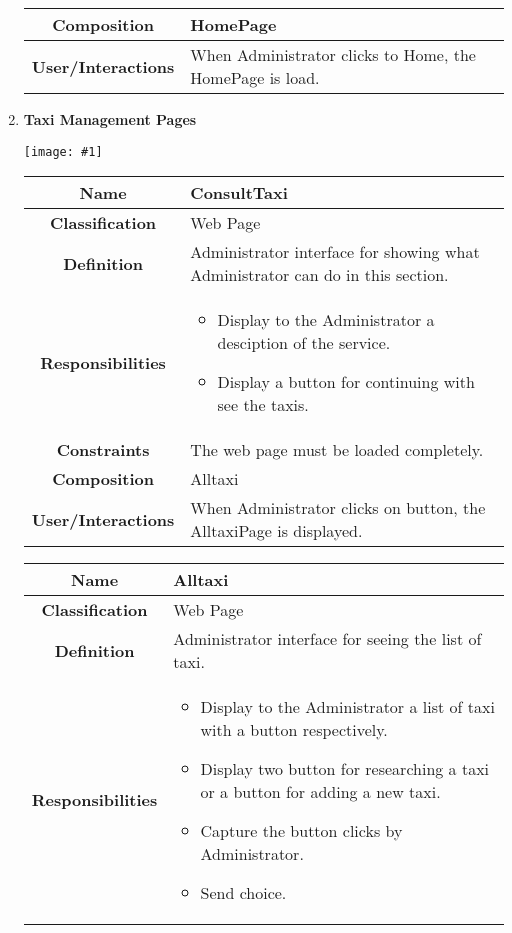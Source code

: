 \documentclass[11pt, a4paper,titlepage]{article}
\newcommand{\image}[1]{
	\begin{center}
		\noindent \texttt{[image: \#1]}
	\end{center}
	}
\begin{document}
\begin{enumerate}
\begin{tabularx}{\textwidth}{| c | X |}
	\\
	\hline
	\textbf{Composition} & HomePage
	\\
	\hline
	\textbf{User/Interactions} & When Administrator clicks to Home, the HomePage is load.
	\\
	\hline 
\end{tabularx}
\newpage
\item \textbf{Taxi Management Pages}\\
\image{page_taximanagement.png}
\begin{tabularx}{\textwidth}{| c | X |}
	\hline
	\textbf{Name} &
	ConsultTaxi
	\\
	\hline
	\textbf{Classification} &
	Web Page
	\\
	\hline
	\textbf{Definition} &
	Administrator interface for showing what Administrator can do in this section.\\
	\hline
	\textbf{Responsibilities} &
	\begin{itemize}
		\item Display to the Administrator a desciption of the service.
		\item Display a button for continuing with see the taxis.
	\end{itemize}
	\\
	\hline
	\textbf{Constraints} & The web page must be loaded completely.
	\\
	\hline
	\textbf{Composition} &
	Alltaxi
	\\
	\hline
	\textbf{User/Interactions} &
	When Administrator clicks on button, the AlltaxiPage is displayed.
	\\
	\hline 
\end{tabularx}
\begin{tabularx}{\textwidth}{| c | X |}
	\hline
	\textbf{Name} &
	Alltaxi
	\\
	\hline
	\textbf{Classification} &
	Web Page
	\\
	\hline
	\textbf{Definition} &
	Administrator interface for seeing the list of taxi.\\
	\hline
	\textbf{Responsibilities} &
	\begin{itemize}
		\item Display to the Administrator a list of taxi with a button respectively.
		\item Display two button for researching a taxi or a button for adding a new taxi.
		\item  Capture the button clicks by Administrator.
		\item Send choice.
	\end{itemize}

\end{tabularx}
\end{enumerate}
\end{document}
